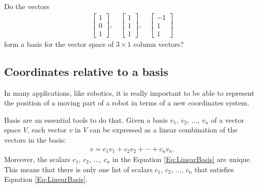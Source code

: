 \documentclass[12pt,a4paper]{article}
\newcounter{example}[section]
\begin{document}
	\begin{example}\label{Ex:BasisOtherStandard}
	Do the vectors
		\begin{align*}
		\begin{bmatrix}
		1 \\ 0 \\ 1
		\end{bmatrix} , \quad
		\begin{bmatrix}
		1 \\ 1 \\ 1
		\end{bmatrix} , \quad
		\begin{bmatrix}
		-1 \\ 1 \\ 1
		\end{bmatrix}
		\end{align*}
	form a basis for the vector space of $3 \times 1$ column vectors?
	\end{example}
	
	
	
	\newpage
	
	\subsection{Coordinates relative to a basis}
	
	In many applications, like robotics, it is really important to be able to represent the position of a moving part of a robot in terms of a new coordinates system. 
	
	\vspace*{14pt}
	
	\noindent Basis are an essential tools to do that. Given a basis $v_1$, $v_2$, $\ldots$, $v_n$ of a vector space $V$, each vector $v$ in $V$ can be expressed as a linear combination of the vectors in the basis:
		\begin{align}
		v = c_1 v_1 + c_2 v_2 + \cdots + c_n v_n . \label{Eq:LinearBasis}
		\end{align}
	Moreover, the scalars $c_1$, $c_2$, $\ldots$, $c_n$ in the Equation \eqref{Eq:LinearBasis} are unique. This means that there is only one list of scalars $c_1$, $c_2$, $\ldots$, $c_n$ that satisfies Equation \eqref{Eq:LinearBasis}.
	
\end{document}
